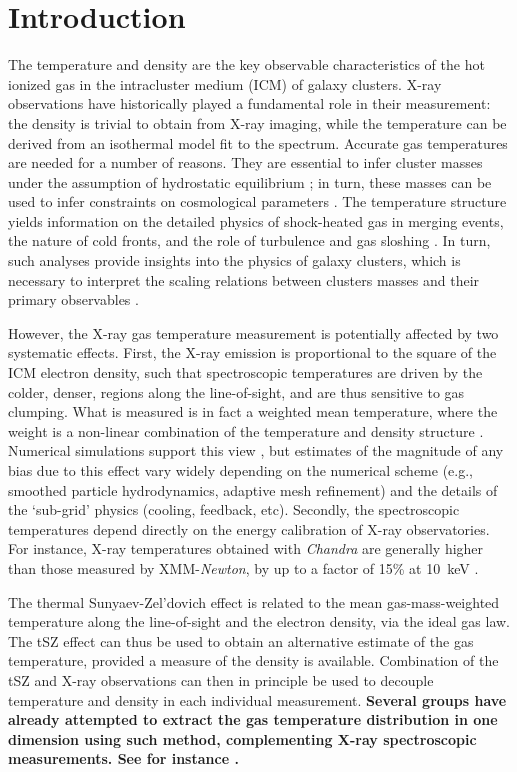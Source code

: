 \documentclass[twocolumn,traditabstract]{aa}
\begin{document}
\section{Introduction}\label{sec:Introduction}
The temperature and density are the key observable characteristics of the hot ionized gas in the intracluster medium (ICM) of galaxy clusters. X-ray observations have historically played a fundamental role in their measurement: the density is trivial to obtain from X-ray imaging, while the temperature can be derived from an isothermal model fit to the spectrum. Accurate gas temperatures are needed for a number of reasons. They are essential to infer cluster masses under the assumption of hydrostatic equilibrium \citep{Sarazin1988}; in turn, these masses can be used to infer constraints on cosmological parameters \citep[e.g.,][]{Allen2011}. The temperature structure yields information on the detailed physics of shock-heated gas in merging events, the nature of cold fronts, and the role of turbulence and gas sloshing \citep[see, e.g.,][for a review]{mar07}. In turn, such analyses provide insights into the physics of galaxy clusters, which is necessary to interpret the scaling relations between clusters masses and their primary observables \citep{Khedekar2013}.

However, the X-ray gas temperature measurement is potentially affected by two systematic effects. First, the X-ray emission is proportional to the square of the ICM electron density, such that spectroscopic temperatures are driven by the colder,  denser, regions along the line-of-sight, and are thus sensitive to gas clumping. What is measured is in fact a weighted mean temperature, where the weight is a non-linear combination of the temperature and density structure \citep[see, e.g.,][]{maz04,vik06b}. Numerical simulations support this view \citep[e.g.,][]{Nagai2007,ras14}, but estimates of the magnitude of any bias due to this effect vary widely depending on the numerical scheme (e.g., smoothed particle hydrodynamics, adaptive mesh refinement) and the details of the `sub-grid' physics (cooling, feedback, etc). Secondly, the spectroscopic temperatures depend directly on the energy calibration of X-ray observatories. For instance, X-ray temperatures obtained with \textit{Chandra} are generally higher than those measured by XMM-\textit{Newton}, by up to a factor of 15\% at 10~keV \citep[e.g.,][]{Mahdavi2013}.

The thermal Sunyaev-Zel'dovich \citep[tSZ,][]{Sunyaev1972} effect is related to the mean gas-mass-weighted temperature along the line-of-sight and the electron density, via the ideal gas law. The tSZ effect can thus be used to obtain an alternative estimate of the gas temperature, provided a measure of the density is available. Combination of the tSZ and X-ray observations can then in principle be used to decouple temperature and density in each individual measurement. {\bf Several groups have already attempted to extract the gas temperature distribution in one dimension using such method, complementing X-ray spectroscopic measurements. See for instance \cite{Pointecouteau2002,Kitayama2004,Nord2009,Basu2010,Eckert2013,Ruppin2016}.}
\end{document}
